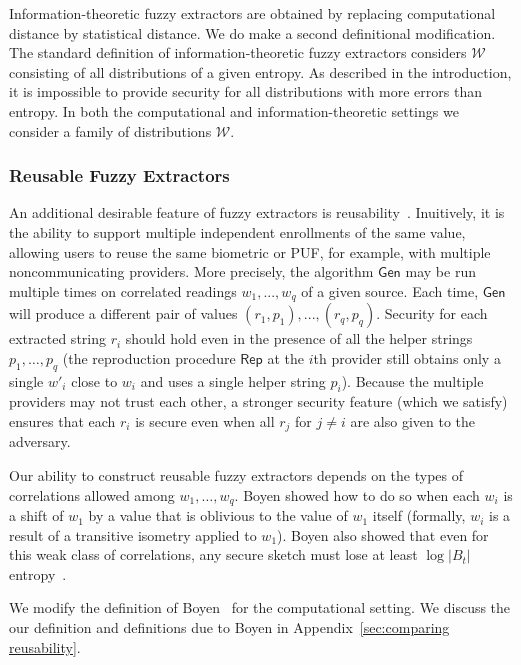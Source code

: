 \documentclass[11pt]{article}
\newcommand{\apref}[1]{\mbox{Appendix~\ref{#1}}}
\newcommand{\class}[1]{{\ensuremath{\mathsf{#1}}}}
\newcommand{\gen}{\ensuremath{\class{Gen}}\xspace}
\newcommand{\rep}{\ensuremath{\class{Rep}}\xspace}
\begin{document}
Information-theoretic fuzzy extractors are obtained by replacing computational distance by statistical distance.  We do make a second definitional modification.  The standard definition of information-theoretic fuzzy extractors considers $\mathcal{W}$  consisting of all distributions of a given entropy.  As described in the introduction, it is impossible to provide security for all distributions with more errors than entropy.  In both the computational and information-theoretic settings we consider a family of distributions $\mathcal{W}$.

\subsubsection{Reusable Fuzzy Extractors}
\label{sec:reusable}

An additional desirable feature of fuzzy extractors is reusability~\cite{Boyen2004}. Inuitively, it is the ability to support multiple independent enrollments of the same value, allowing users to reuse the same biometric or PUF, for example, with multiple noncommunicating providers. More precisely, the algorithm $\gen$ may be run multiple times on correlated readings $w_1,..., w_q$ of a given source. Each time, $\gen$ will produce a different pair of values $(r_1, p_1),..., (r_q, p_q)$. Security for each extracted string $r_i$ should hold even in the presence of all the helper strings $p_1, \dots, p_q$ (the reproduction procedure $\rep$ at the $i$th provider still obtains only a single $w'_i$ close to $w_i$ and uses a single helper string $p_i$). Because the multiple providers may not trust each other, a stronger security feature (which we satisfy) ensures that each $r_i$ is secure even when all $r_j$ for $j\neq i$ are also given to the adversary.

 Our ability to construct reusable fuzzy extractors depends on the types of correlations allowed among $w_1, \dots, w_q$. Boyen \cite{Boyen2004} showed how to do so when each $w_i$ is a shift of $w_1$ by a value that is oblivious to the value of $w_1$ itself (formally, $w_i$ is a result of a transitive isometry applied to $w_1$). Boyen also showed that even for this weak class of correlations, any secure sketch must lose at least $\log |B_t|$ entropy~\cite[Theorem 11]{Boyen2004}.
  

We modify the definition of Boyen~\cite[Definition 6]{Boyen2004} for the computational setting.  We discuss the our definition and definitions due to Boyen in \apref{sec:comparing reusability}.
\end{document}
